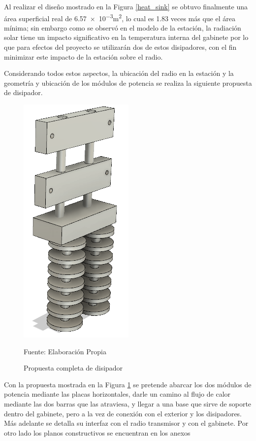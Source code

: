 Al realizar el diseño mostrado en la Figura \ref{heat_sink} se obtuvo finalmente una área superficial real de \num{6,57e-3}\si{\square\meter}, lo cual es \num{1,83} veces más que el área mínima; sin embargo como se observó en el modelo de la estación, la radiación solar tiene un impacto significativo en la temperatura interna del gabinete por lo que para efectos del proyecto se utilizarán dos de estos disipadores, con el fin minimizar este impacto de la estación sobre el radio.

Considerando todos estos aspectos, la ubicación del radio en la estación y la geometría y ubicación de los módulos de potencia se realiza la siguiente propuesta de disipador.

\begin{figure}[H]
\centering
\includegraphics[scale=0.6]{Figuras/heat_sink_completo.png}
\caption{Propuesta completa de disipador}
Fuente: Elaboración Propia
\label{heat_sink_completo}
\end{figure}

Con la propuesta mostrada en la Figura \ref{heat_sink_completo} se pretende abarcar los dos módulos de potencia mediante las placas horizontales, darle un camino al flujo de calor mediante las dos barras que las atraviesa, y llegar a una base que sirve de soporte dentro del gabinete, pero a la vez de conexión con el exterior y los disipadores. Más adelante se detalla su interfaz con el radio transmisor y con el gabinete. Por otro lado los planos constructivos se encuentran en los anexos

